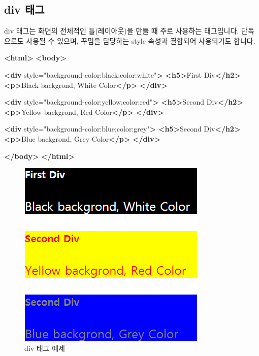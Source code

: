 \documentclass[]{book}
\newenvironment{Shaded}{\begin{snugshade}}{\end{snugshade}}
\newcommand{\KeywordTok}[1]{\textcolor[rgb]{0.13,0.29,0.53}{\textbf{#1}}}
\newcommand{\NormalTok}[1]{#1}
\newcommand{\OtherTok}[1]{\textcolor[rgb]{0.56,0.35,0.01}{#1}}
\newcommand{\StringTok}[1]{\textcolor[rgb]{0.31,0.60,0.02}{#1}}
\begin{document}
\hypertarget{div-}{%
\subsection{div 태그}\label{div-}}

div 태그는 화면의 전체적인 틀(레이아웃)을 만들 때 주로 사용하는 태그입니다. 단독으로도 사용될 수 있으며, 꾸밈을 담당하는 style 속성과 결합되어 사용되기도 합니다.

\begin{Shaded}
\begin{Highlighting}[]
\KeywordTok{<html>}
\KeywordTok{<body>}

\KeywordTok{<div}\OtherTok{ style=}\StringTok{"background-color:black;color:white"}\KeywordTok{>}
  \KeywordTok{<h5>}\NormalTok{First Div}\KeywordTok{</h2>}
  \KeywordTok{<p>}\NormalTok{Black backgrond, White Color}\KeywordTok{</p>}
\KeywordTok{</div>} 

\KeywordTok{<div}\OtherTok{ style=}\StringTok{"background-color:yellow;color:red"}\KeywordTok{>}
  \KeywordTok{<h5>}\NormalTok{Second Div}\KeywordTok{</h2>}
  \KeywordTok{<p>}\NormalTok{Yellow backgrond, Red Color}\KeywordTok{</p>}
\KeywordTok{</div>} 

\KeywordTok{<div}\OtherTok{ style=}\StringTok{"background-color:blue;color:grey"}\KeywordTok{>}
  \KeywordTok{<h5>}\NormalTok{Second Div}\KeywordTok{</h2>}
  \KeywordTok{<p>}\NormalTok{Blue backgrond, Grey Color}\KeywordTok{</p>}
\KeywordTok{</div>} 

\KeywordTok{</body>}
\KeywordTok{</html>}
\end{Highlighting}
\end{Shaded}

\begin{figure}

{\centering \includegraphics[width=0.5\linewidth]{images/html_7} 

}

\caption{div 태그 예제}\label{fig:unnamed-chunk-20}
\end{figure}
\end{document}
